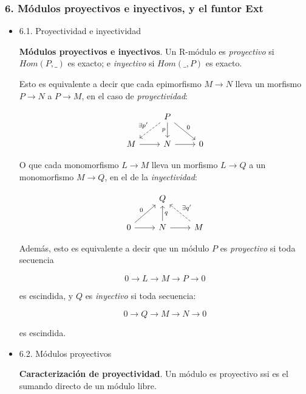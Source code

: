 \documentclass[11pt]{article}
\begin{document}
\subsubsection*{6. Módulos proyectivos e inyectivos, y el funtor Ext}
\label{sec-4-4-4}
\begin{itemize}
\item 6.1. Proyectividad e inyectividad
\label{sec-4-4-4-1}
\begin{definition}
\textbf{Módulos proyectivos e inyectivos}. Un R-módulo es \emph{proyectivo} si $Hom(P,\_)$
es exacto; e \emph{inyectivo} si $Hom(\_,P)$ es exacto.
\end{definition}

Esto es equivalente a decir que cada epimorfismo $M \longrightarrow N$ lleva un
morfismo $P \longrightarrow N$ a $P \longrightarrow M$, en el caso de \emph{proyectividad}:

\[ \begin{tikzcd}
  & P \dlar[swap,dashed]{\exists p'} \dar[swap]{p} \drar{0} & \\
 M \rar & N \rar & 0
 \end{tikzcd} \]

O que cada monomorfismo $L \longrightarrow M$ lleva un morfismo $L \longrightarrow Q$ a
un monomorfismo $M \longrightarrow Q$, en el de la \emph{inyectividad}:

\[ \begin{tikzcd}
  & Q & \\
 0 \urar{0} \rar & N \rar \uar[swap]{q} & M \ular[dashed,swap]{\exists q'}
 \end{tikzcd} \]

Además, esto es equivalente a decir que un módulo $P$ es \emph{proyectivo} si toda secuencia

\[ 0 \overset{}\longrightarrow L \overset{}\longrightarrow M \overset{}\longrightarrow P \overset{}\longrightarrow 0 \]

es escindida, y $Q$ es \emph{inyectivo} si toda secuencia:

\[ 0 \overset{}\longrightarrow Q \overset{}\longrightarrow M \overset{}\longrightarrow N \overset{}\longrightarrow 0 \]

es escindida.

\item 6.2. Módulos proyectivos
\label{sec-4-4-4-2}
\begin{theorem}
\textbf{Caracterización de proyectividad}. Un módulo es proyectivo ssi es el sumando
directo de un módulo libre.
\end{theorem}


\end{itemize}
\end{document}
